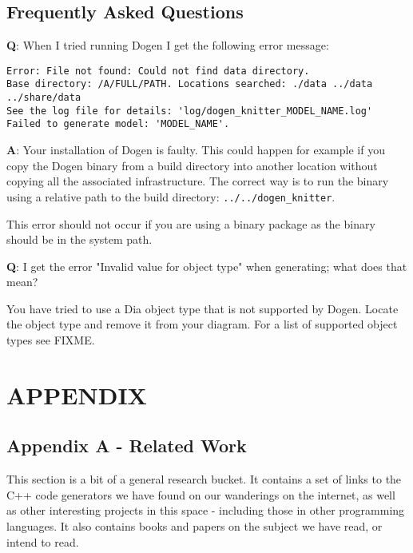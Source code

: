 \documentclass[11pt]{article}
\begin{document}
\subsection{Frequently Asked Questions}
\label{sec-3-5}

\textbf{Q}: When I tried running Dogen I get the following error message:

\begin{verbatim}
Error: File not found: Could not find data directory.
Base directory: /A/FULL/PATH. Locations searched: ./data ../data ../share/data
See the log file for details: 'log/dogen_knitter_MODEL_NAME.log'
Failed to generate model: 'MODEL_NAME'.
\end{verbatim}

\textbf{A}: Your installation of Dogen is faulty. This could happen for
example if you copy the Dogen binary from a build directory into
another location without copying all the associated
infrastructure. The correct way is to run the binary using a relative
path to the build directory: \texttt{../../dogen\_knitter}.

This error should not occur if you are using a binary package as the
binary should be in the system path.

\textbf{Q}: I get the error "Invalid value for object type" when generating;
 what does that mean?

You have tried to use a Dia object type that is not supported by
Dogen. Locate the object type and remove it from your diagram. For a
list of supported object types see FIXME.

\section{APPENDIX}
\label{sec-4}

\subsection{Appendix A - Related Work}
\label{sec-4-1}

This section is a bit of a general research bucket. It contains a set
of links to the C++ code generators we have found on our wanderings on
the internet, as well as other interesting projects in this space -
including those in other programming languages. It also contains books
and papers on the subject we have read, or intend to read.
\end{document}
